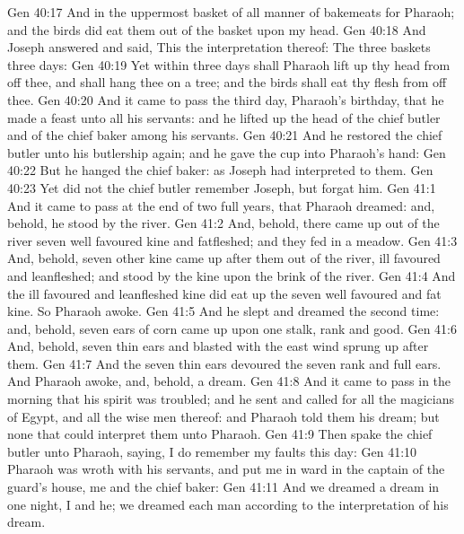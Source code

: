 \vs Gen 40:17 And in the uppermost basket  of all manner of bakemeats for Pharaoh; and the birds did eat them out of the basket upon my head.
\vs Gen 40:18 And Joseph answered and said, This  the interpretation thereof: The three baskets  three days:
\vs Gen 40:19 Yet within three days shall Pharaoh lift up thy head from off thee, and shall hang thee on a tree; and the birds shall eat thy flesh from off thee.
\vs Gen 40:20 And it came to pass the third day,  Pharaoh's birthday, that he made a feast unto all his servants: and he lifted up the head of the chief butler and of the chief baker among his servants.
\vs Gen 40:21 And he restored the chief butler unto his butlership again; and he gave the cup into Pharaoh's hand:
\vs Gen 40:22 But he hanged the chief baker: as Joseph had interpreted to them.
\vs Gen 40:23 Yet did not the chief butler remember Joseph, but forgat him.
\vs Gen 41:1 And it came to pass at the end of two full years, that Pharaoh dreamed: and, behold, he stood by the river.
\vs Gen 41:2 And, behold, there came up out of the river seven well favoured kine and fatfleshed; and they fed in a meadow.
\vs Gen 41:3 And, behold, seven other kine came up after them out of the river, ill favoured and leanfleshed; and stood by the  kine upon the brink of the river.
\vs Gen 41:4 And the ill favoured and leanfleshed kine did eat up the seven well favoured and fat kine. So Pharaoh awoke.
\vs Gen 41:5 And he slept and dreamed the second time: and, behold, seven ears of corn came up upon one stalk, rank and good.
\vs Gen 41:6 And, behold, seven thin ears and blasted with the east wind sprung up after them.
\vs Gen 41:7 And the seven thin ears devoured the seven rank and full ears. And Pharaoh awoke, and, behold,  a dream.
\vs Gen 41:8 And it came to pass in the morning that his spirit was troubled; and he sent and called for all the magicians of Egypt, and all the wise men thereof: and Pharaoh told them his dream; but  none that could interpret them unto Pharaoh.
\vs Gen 41:9 Then spake the chief butler unto Pharaoh, saying, I do remember my faults this day:
\vs Gen 41:10 Pharaoh was wroth with his servants, and put me in ward in the captain of the guard's house,  me and the chief baker:
\vs Gen 41:11 And we dreamed a dream in one night, I and he; we dreamed each man according to the interpretation of his dream.
